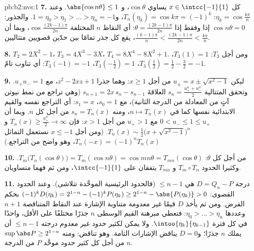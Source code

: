 \begin{solution}{pb:b2:nvs:1}
\textbf{7.} كل $x \in \intcc{-1}{1}$ يساوي $\cos\theta$، و
$\abs{\cos n\theta} \leq 1$. وعند $\eta_k = \cos\frac{k\pi}n$:
$T_n(\eta_k) = \cos k\pi = (-1)^k$، و$1 = \eta_0 > \eta_1 >
\dots > \eta_n = -1$. والجذور: $\cos n\theta = 0$ إذا وفقط إذا $\theta =
\frac{(2k-1)\pi}{2n}$: أي النقاط $n$ المختلفة
$\cos\frac{(2k-1)\pi}{2n}$، وبما أن $\frac{(k-1)\pi}n <
\frac{(2k-1)\pi}{2n} < \frac{k\pi}n$، يقع كل جذر تمامًا
بين حدّين قصويين متتاليين.

\textbf{8.} $T_2 = 2X^2 - 1$، $T_3 = 4X^3 - 3X$، $T_4 = 8X^4 -
8X^2 + 1$. ومن أجل $T_3$: $T_3(1) = 1$، $T_3(\tfrac12) = \tfrac12 -
\tfrac32 = -1$، $T_3(-\tfrac12) = 1$، $T_3(-1) = -1$: أي تناوب
تامّ.

\textbf{9.} ليكن $u_\pm = x \pm \sqrt{x^2 - 1}$ من أجل $x \geq 1$:
وهما جذرا $z^2 - 2xz + 1$، مع $u_+u_- = 1$. وتحقق المتتالية
$s_n = \frac{u_+^n + u_-^n}2$ العلاقةَ $s_{n+1} = 2x\,s_n -
s_{n-1}$ (وهي تراجع من نمط نيوتن آتٍ من المعادلة من الدرجة الثانية)، مع $s_0 = 1$،
$s_1 = x$: أي التراجع نفسه والقيم الابتدائية نفسها كما في $n \mapsto
T_n(x)$، ومنه $s_n = T_n(x)$ من أجل كل $n$. وبما أن $0 < u_- \leq 1
\leq u_+$ مع $u_+ > 1$ من أجل $x > 1$: فإن $T_n(x) \geq
\frac{u_+^n}2 \to \infty$ و$T_n(x) \sim \frac12\bigl(x +
\sqrt{x^2-1}\bigr)^n$. (ومن أجل $x \leq -1$ نستعمل التماثل $T_n(-x)
= (-1)^nT_n(x)$، وهو واضح من التراجع.)

\textbf{10.} من أجل كل $\theta$: $T_m\bigl(T_n(\cos\theta)\bigr)
= T_m(\cos n\theta) = \cos mn\theta =
T_{mn}(\cos\theta)$. وكثيرا الحدود $T_m \circ T_n$ و
$T_{mn}$ يتفقان على $\intcc{-1}{1}$، ومن ثم فهما متساويان.

\textbf{11.} درجة $D = Q_n - P$ هي $\leq n - 1$ (فالحدود
الرئيسية الموحَّدة تتلاشى). وعند الحدود القصوى: $(-1)^kD(\eta_k) =
2^{1-n} - (-1)^kP(\eta_k) \geq 2^{1-n} - \abs{P(\eta_k)} > 0$ بحكم
الفرض. ومن ثم يأخذ $D$ قيمًا غير معدومة متناوبة الإشارة عند
النقاط المتناقصة $n + 1$ وعددها $\eta_0 > \dots > \eta_n$: فتعطي
مبرهنة القيم الوسطى $n$ جذرًا مختلفًا على الأقل،
واحدًا في كل فترة  $\intoo{\eta_{k}}{\eta_{k-1}}$. ولا يمكن
لكثير حدود غير معدوم درجته $\leq n - 1$ أن يملك $n$ جذرًا؛
و$D = 0$ يناقض الإشارات التامة. وهو تناقض:
ومنه $\sup\abs P \geq 2^{1-n}$ من أجل كل كثير حدود موحَّد $P$ من الدرجة $n$.


\end{solution}
